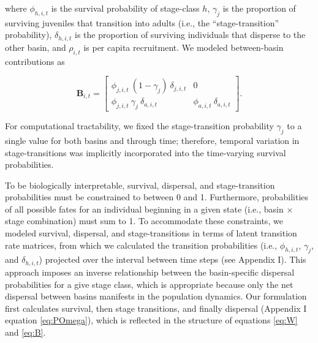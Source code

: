 \documentclass[11pt]{article}
\begin{document}
%
where $\phi_{h,i,t}$ is the survival probability of stage-class $h$, 
$\gamma_{j}$ is the proportion of surviving juveniles that transition into adults
(i.e., the ``stage-transition'' probability),
$\delta_{h,i,t}$ is the proportion of surviving individuals that disperse to the other basin,
and $\rho_{i,t}$ is per capita recruitment.
We modeled between-basin contributions as
%
\begin{linenomath*}
\begin{equation} \label{eq:B}
\mathbf{B}_{i,t} = 
\left[
\begin{array}{cccc}
    \phi_{j,i,t}~(1 - \gamma_{j})~\delta_{j,i,t} & 
    0 \\
    
    \phi_{j,i,t}~\gamma_{j}~\delta_{a,i,t} & 
    \phi_{a,i,t}~\delta_{a,i,t}
    \end{array}
\right].
\end{equation}
\end{linenomath*}
%
For computational tractability, 
we fixed the stage-transition probability $\gamma_{j}$ to a single value 
for both basins and through time; 
therefore, temporal variation in stage-transitions was implicitly incorporated 
into the time-varying survival probabilities.

To be biologically interpretable, 
survival, dispersal, and stage-transition probabilities must be constrained to between
0 and 1.
Furthermore, 
probabilities of all possible fates for an individual beginning in a given state 
(i.e., basin $\times$ stage combination) must sum to 1.
To accommodate these constraints,
we modeled survival, dispersal, and stage-transitions 
in terms of latent transition rate matrices,
from which we calculated the transition probabilities 
(i.e., $\phi_{h,i,t}$, $\gamma_{j}$, and $\delta_{h,i,t}$) 
projected over the interval between time steps (see Appendix I).
This approach imposes an inverse relationship between
the basin-specific dispersal probabilities for a give stage class,
which is appropriate because only the net dispersal between basins manifests 
in the population dynamics. 
Our formulation first calculates survival, then stage transitions, and finally dispersal
(Appendix I equation \ref{eq:POmega}),
which is reflected in the structure of equations \ref{eq:W} and \ref{eq:B}. 
\end{document}
